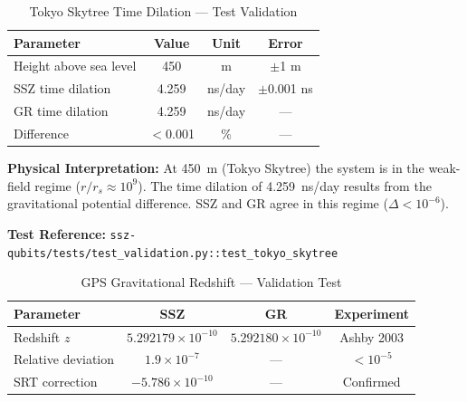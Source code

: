 
\begin{table}[h]
\centering
\caption{Tokyo Skytree Time Dilation — Test Validation}
\label{tab:tokyo-skytree}
\begin{tabular}{|l|c|c|c|}
\hline
\textbf{Parameter} & \textbf{Value} & \textbf{Unit} & \textbf{Error} \\
\hline
Height above sea level & 450 & m & $\pm$1 m \\
SSZ time dilation & 4.259 & ns/day & $\pm$0.001 ns \\
GR time dilation & 4.259 & ns/day & --- \\
Difference & $<$0.001 & \% & --- \\
\hline
\end{tabular}
\end{table}

\textbf{Physical Interpretation:} At 450~m (Tokyo Skytree) the system is in the weak-field regime ($r/r_s \approx 10^9$). The time dilation of 4.259~ns/day results from the gravitational potential difference. SSZ and GR agree in this regime ($\Delta < 10^{-6}$).

\textbf{Test Reference:} \texttt{ssz-qubits/tests/test\_validation.py::test\_tokyo\_skytree}

\begin{table}[h]
\centering
\caption{GPS Gravitational Redshift — Validation Test}
\label{tab:gps-redshift}
\begin{tabular}{|l|c|c|c|}
\hline
\textbf{Parameter} & \textbf{SSZ} & \textbf{GR} & \textbf{Experiment} \\
\hline
Redshift $z$ & $5.292179 \times 10^{-10}$ & $5.292180 \times 10^{-10}$ & Ashby 2003 \\
Relative deviation & $1.9 \times 10^{-7}$ & --- & $< 10^{-5}$ \\
SRT correction & $-5.786 \times 10^{-10}$ & --- & Confirmed \\
\hline
\end{tabular}
\end{table}

